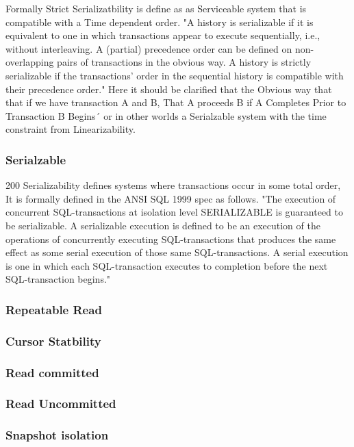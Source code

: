 \documentclass[a4paper,10pt,titlepage]{report}
\begin{document}
Formally Strict Serializatbility is define as as Serviceable system that is compatible with a Time dependent order.
"A history is serializable if it is equivalent to one in which transactions appear to execute sequentially, i.e., without interleaving. A (partial) precedence order can be defined on non-overlapping pairs of transactions in the obvious way. A history is strictly serializable if the transactions’ order in the sequential history is compatible with their precedence order."\cite{10.1145/78969.78972}
Here it should be clarified that the Obvious way that that if we have transaction A and B, That A proceeds B if A Completes Prior to Transaction B Begins´ or in other worlds a Serialzable system with the time constraint from Linearizability.

\subsubsection{Serialzable}

200
Serializability defines systems where transactions occur in some total order, It is formally defined in the ANSI SQL 1999 spec as follows. "The execution of concurrent SQL-transactions at isolation level SERIALIZABLE is guaranteed to be serializable. A serializable execution is defined to be an execution of the operations of concurrently executing SQL-transactions that produces the same effect as some serial execution of those same SQL-transactions. A serial execution is one in which each SQL-transaction executes to completion before the next SQL-transaction begins."\cite{ansisql1999}

\subsubsection{Repeatable Read}

\subsubsection{Cursor Statbility}

\subsubsection{Read committed}

\subsubsection{Read Uncommitted}

\subsubsection{Snapshot isolation}
\end{document}
